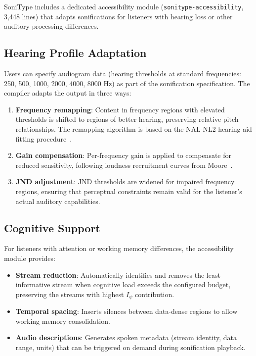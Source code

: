 \documentclass[sigchi, nonacm]{acmart}
\begin{document}
SoniType includes a dedicated accessibility module (\texttt{sonitype-accessibility}, 3,448 lines) that adapts sonifications for listeners with hearing loss or other auditory processing differences.

\subsection{Hearing Profile Adaptation}

Users can specify audiogram data (hearing thresholds at standard frequencies: 250, 500, 1000, 2000, 4000, 8000 Hz) as part of the sonification specification. The compiler adapts the output in three ways:

\begin{enumerate}
    \item \textbf{Frequency remapping}: Content in frequency regions with elevated thresholds is shifted to regions of better hearing, preserving relative pitch relationships. The remapping algorithm is based on the NAL-NL2 hearing aid fitting procedure~\cite{keidser2011nal}.
    \item \textbf{Gain compensation}: Per-frequency gain is applied to compensate for reduced sensitivity, following loudness recruitment curves from Moore~\cite{moore2012introduction}.
    \item \textbf{JND adjustment}: JND thresholds are widened for impaired frequency regions, ensuring that perceptual constraints remain valid for the listener's actual auditory capabilities.
\end{enumerate}

\subsection{Cognitive Support}

For listeners with attention or working memory differences, the accessibility module provides:

\begin{itemize}
    \item \textbf{Stream reduction}: Automatically identifies and removes the least informative stream when cognitive load exceeds the configured budget, preserving the streams with highest $I_\psi$ contribution.
    \item \textbf{Temporal spacing}: Inserts silences between data-dense regions to allow working memory consolidation.
    \item \textbf{Audio descriptions}: Generates spoken metadata (stream identity, data range, units) that can be triggered on demand during sonification playback.
\end{itemize}
\end{document}

